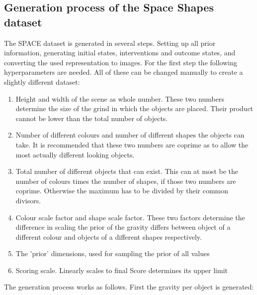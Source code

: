 \documentclass{report}
\begin{document}
\begin{appendices}
\renewcommand{\arraystretch}{1.3}
\chapter{Generation process of the Space Shapes dataset}
\label{appendix:space_shapes}
The SPACE dataset is generated in several steps. Setting up all prior information, generating initial states, interventions and outcome states, and converting the used representation to images. For the first step the following hyperparameters are needed. All of these can be changed manually to create a slightly different dataset:
\begin{enumerate}
    \item Height and width of the scene as whole number. These two numbers determine the size of the grind in which the objects are placed. Their product cannot be lower than the total number of objects.
    \item Number of different colours and number of different shapes the objects can take. It is recommended that these two numbers are coprime as to allow the most actually different looking objects.
    \item Total number of different objects that can exist. This can at most be the number of colours times the number of shapes, if those two numbers are coprime. Otherwise the maximum has to be divided by their common divisors.
    \item Colour scale factor and shape scale factor. These two factors determine the difference in scaling the prior of the gravity differs between object of a different colour and objects of a different shapes respectively.
    \item The 'prior' dimensions, used for sampling the prior of all values
    \item Scoring scale. Linearly scales to final Score determines its upper limit
\end{enumerate}
The generation process works as follows. First the gravity per object is generated:


\end{appendices}
\end{document}
